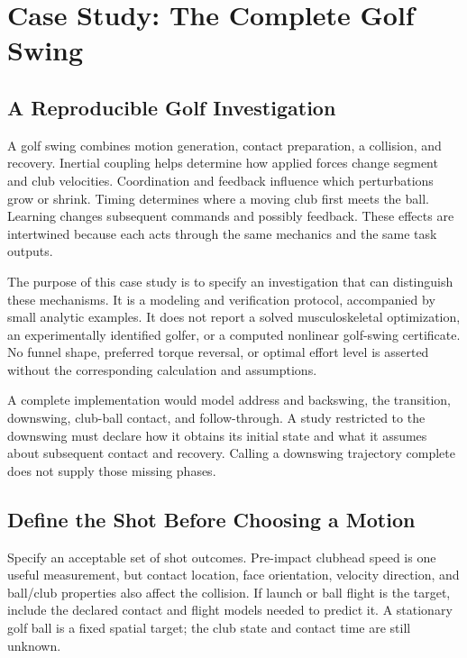 \documentclass[12pt, openany]{book}
\theoremstyle{plain}
\begin{document}
\chapter{Case Study: The Complete Golf Swing}
\label{ch:case_study_golf_swing}
\begingroup
\raggedbottom
{}

\section{A Reproducible Golf Investigation}

A golf swing combines motion generation, contact preparation, a collision, and recovery. Inertial coupling helps determine how applied forces change segment and club velocities. Coordination and feedback influence which perturbations grow or shrink. Timing determines where a moving club first meets the ball. Learning changes subsequent commands and possibly feedback. These effects are intertwined because each acts through the same mechanics and the same task outputs.

The purpose of this case study is to specify an investigation that can distinguish these mechanisms. It is a modeling and verification protocol, accompanied by small analytic examples. It does not report a solved musculoskeletal optimization, an experimentally identified golfer, or a computed nonlinear golf-swing certificate. No funnel shape, preferred torque reversal, or optimal effort level is asserted without the corresponding calculation and assumptions.

A complete implementation would model address and backswing, the transition, downswing, club-ball contact, and follow-through. A study restricted to the downswing must declare how it obtains its initial state and what it assumes about subsequent contact and recovery. Calling a downswing trajectory complete does not supply those missing phases.

\section{Define the Shot Before Choosing a Motion}

Specify an acceptable set of shot outcomes. Pre-impact clubhead speed is one useful measurement, but contact location, face orientation, velocity direction, and ball/club properties also affect the collision. If launch or ball flight is the target, include the declared contact and flight models needed to predict it. A stationary golf ball is a fixed spatial target; the club state and contact time are still unknown.
\end{document}
